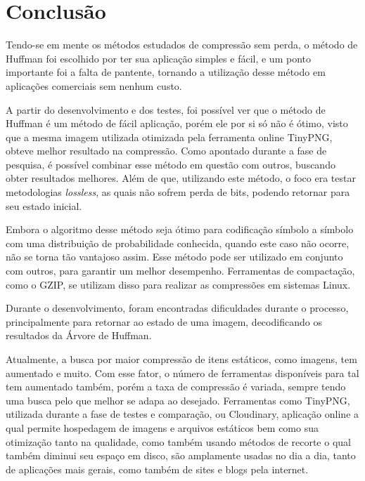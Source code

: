 \chapter{Conclusão}
\label{c.conclusao}

Tendo-se em mente os métodos estudados de compressão sem perda, o método de Huffman foi escolhido por ter sua aplicação simples e fácil, e um ponto importante foi a falta de pantente, tornando a utilização desse método em aplicações comerciais sem nenhum custo.

A partir do desenvolvimento e dos testes, foi possível ver que o método de Huffman é um método de fácil aplicação, porém ele por si só não é ótimo, visto que a mesma imagem utilizada otimizada pela ferramenta online TinyPNG, obteve melhor resultado na compressão. Como apontado durante a fase de pesquisa, é possível combinar esse método em questão com outros, buscando obter resultados melhores. Além de que, utilizando este método, o foco era testar metodologias {\em lossless}, as quais não sofrem perda de bits, podendo retornar para seu estado inicial.

Embora o algoritmo desse método seja ótimo para codificação símbolo a símbolo com uma distribuição de probabilidade conhecida, quando este caso não ocorre, não se torna tão vantajoso assim. Esse método pode ser utilizado em conjunto com outros, para garantir um melhor desempenho. Ferramentas de compactação, como o GZIP, se utilizam disso para realizar as compressões em sistemas Linux.

Durante o desenvolvimento, foram encontradas dificuldades durante o processo, principalmente para retornar ao estado de uma imagem, decodificando os resultados da Árvore de Huffman.

Atualmente, a busca por maior compressão de itens estáticos, como imagens, tem aumentado e muito. Com esse fator, o número de ferramentas disponíveis para tal tem aumentado também, porém a taxa de compressão é variada, sempre tendo uma busca pelo que melhor se adapa ao desejado. Ferramentas como TinyPNG, utilizada durante a fase de testes e comparação, ou Cloudinary, aplicação online a qual permite hospedagem de imagens e arquivos estáticos bem como sua otimização tanto na qualidade, como também usando métodos de recorte o qual também diminui seu espaço em disco, são amplamente usadas no dia a dia, tanto de aplicações mais gerais, como também de sites e blogs pela internet.
